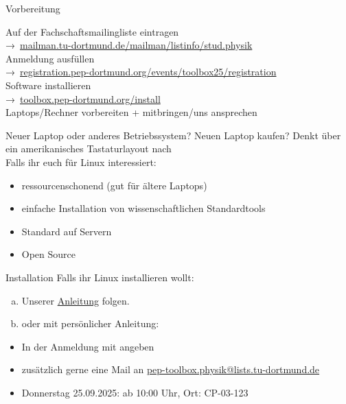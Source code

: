 \begin{frame}{Vorbereitung}
  \begin{center}
    \huge
    Auf der Fachschaftsmailingliste eintragen \\
    →~\href{https://mailman.tu-dortmund.de/mailman/listinfo/stud.physik}{mailman.tu-dortmund.de/mailman/listinfo/stud.physik}\\[0.5\baselineskip]
    Anmeldung ausfüllen\\
    →~\textcolor{blue!70!black}{\href{https://registration.pep-dortmund.org/events/toolbox25/registration/}{registration.pep-dortmund.org/events/toolbox25/registration}}\\[0.5\baselineskip]
    Software installieren\\
    →~\textcolor{blue!70!black}{\href{https://toolbox.pep-dortmund.org/install/install/}{toolbox.pep-dortmund.org/install}}\\[0.5\baselineskip]
    Laptops/Rechner vorbereiten + mitbringen/uns ansprechen
  \end{center}
\end{frame}
\begin{frame}{Neuer Laptop oder anderes Betriebssystem?}
  \huge
  Neuen Laptop kaufen? \newline
  Denkt über ein amerikanisches Tastaturlayout nach\\[0.5\baselineskip]

  Falls ihr euch für Linux interessiert:
	\begin{itemize}
		\item ressourcenschonend (gut für ältere Laptops)
		\item einfache Installation von wissenschaftlichen Standardtools
		\item Standard auf Servern
		\item Open Source
	\end{itemize}
\end{frame}
\begin{frame}{Installation}
  \huge
  Falls ihr Linux installieren wollt:\\[0.5\baselineskip]
	\begin{enumerate}[a)]
    \item Unserer \href{https://toolbox.pep-dortmund.org/install/dualboot/}{Anleitung} folgen.
    \item oder mit persönlicher Anleitung:
  \end{enumerate}
  \begin{itemize}
    \item In der Anmeldung mit angeben
    \item zusätzlich gerne eine Mail an \href{mailto:pep-toolbox.physik@lists.tu-dortmund.de}{pep-toolbox.physik@lists.tu-dortmund.de}
    \item Donnerstag 25.09.2025: ab 10:00 Uhr, Ort: CP-03-123
  \end{itemize}
\end{frame}
